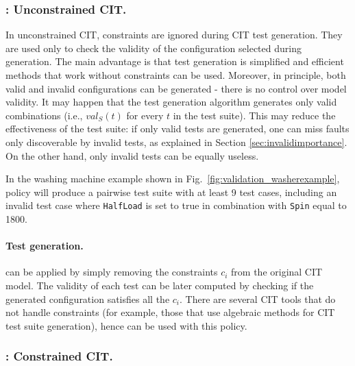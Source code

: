 \begin{tikzborder}{\cite{Gargantini16:validation}}
	\subsubsection{\ic: Unconstrained CIT.}
	\bb
	In unconstrained CIT, constraints are ignored during CIT test generation.
	They are used only to check the validity of the configuration
	selected during generation. The main advantage is that test generation
	is simplified and efficient methods that work without constraints
	can be used. Moreover, in principle, both valid and invalid configurations
	can be generated - there is no control over
	model validity. It may happen that the test generation algorithm generates
	only valid combinations (i.e., $val_{S}(t)$ for every $t$ in the test
	suite). This may reduce the effectiveness of the test suite: if only valid tests are generated, one can miss faults only discoverable by invalid tests, as explained in Section \ref{sec:invalidimportance}. On the other hand, only invalid tests can be equally useless.
	
	\begin{example}
		In the washing machine example shown in Fig.~\ref{fig:validation_washerexample}, 
		\ic policy will produce a pairwise test suite with at least 9 test cases, including an invalid test case
		where \texttt{HalfLoad} is set to true in combination with \texttt{Spin} equal to 1800.
	\end{example}
	\paragraph*{Test generation.}
	\ic can be applied by simply removing the constraints $c_i$ from the original CIT model. The validity of each test can be later computed by checking if the generated configuration satisfies all the $c_i$. There are several CIT tools that do not handle constraints (for example, those that use algebraic methods for CIT test suite generation), hence can be used with this policy.
	
	
	
	\subsubsection{\ccit: Constrained CIT.}
	

\end{tikzborder}
